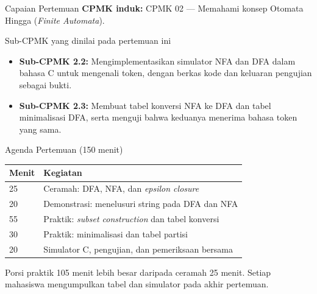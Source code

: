 \documentclass[aspectratio=169,10pt,t]{beamer}
\begin{document}

\begin{frame}{Capaian Pertemuan}
  \textbf{CPMK induk:} CPMK 02 --- Memahami konsep Otomata Hingga
  (\textit{Finite Automata}).

  \vspace{3pt}
  \begin{block}{Sub-CPMK yang dinilai pada pertemuan ini}
    \footnotesize
    \begin{itemize}
      \setlength{\itemsep}{2pt}
      \item \textbf{Sub-CPMK 2.2:} Mengimplementasikan simulator NFA dan
            DFA dalam bahasa C untuk mengenali token, dengan berkas kode
            dan keluaran pengujian sebagai bukti.
      \item \textbf{Sub-CPMK 2.3:} Membuat tabel konversi NFA ke DFA dan
            tabel minimalisasi DFA, serta menguji bahwa keduanya
            menerima bahasa token yang sama.
    \end{itemize}
  \end{block}
\end{frame}

\begin{frame}{Agenda Pertemuan (150 menit)}
  \small
  \begin{tabular}{@{}p{1.4cm}p{12.3cm}@{}}
    \toprule
    \textbf{Menit} & \textbf{Kegiatan} \\
    \midrule
    25 & Ceramah: DFA, NFA, dan \textit{epsilon closure} \\
    20 & Demonstrasi: menelusuri string pada DFA dan NFA \\
    55 & Praktik: \textit{subset construction} dan tabel konversi \\
    30 & Praktik: minimalisasi dan tabel partisi \\
    20 & Simulator C, pengujian, dan pemeriksaan bersama \\
    \bottomrule
  \end{tabular}

  \vspace{6pt}
  {\scriptsize\color{ubbblue!75}Porsi praktik 105 menit lebih besar
  daripada ceramah 25 menit. Setiap mahasiswa mengumpulkan tabel dan
  simulator pada akhir pertemuan.}
\end{frame}
\end{document}
